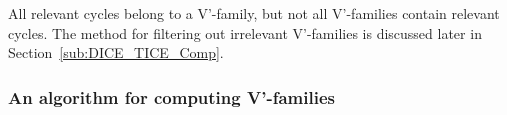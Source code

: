 \documentclass[fleqn,11pt]{article}
\newcommand\calF{\mathcal{F}}
\begin{document}
All relevant cycles belong to a V'-family, but not all V'-families contain relevant cycles.
The method for filtering out irrelevant V'-families is discussed later in Section~\ref{sub:DICE_TICE_Comp}. 

\subsubsection{An algorithm for computing V'-families}



\end{document}
